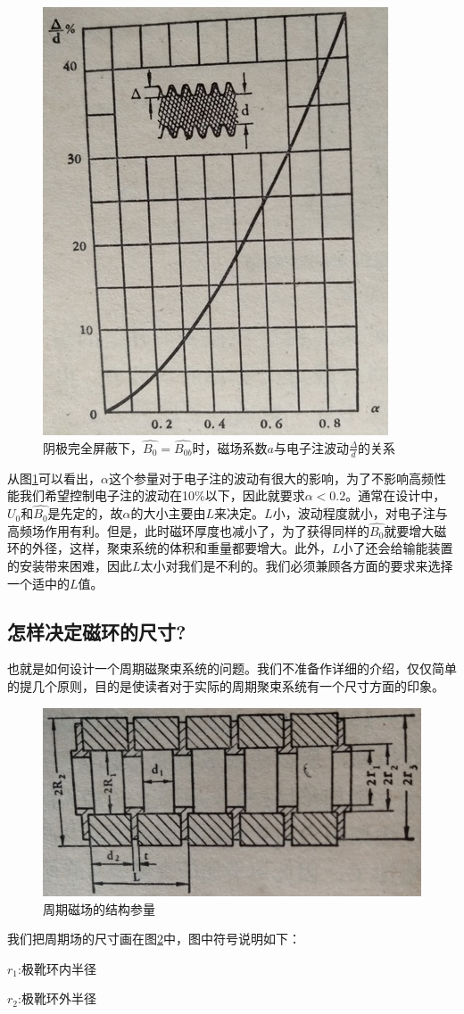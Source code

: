 \begin{figure}[phtb]
	\centering
	\includegraphics[width=0.37\linewidth]{figure/ch7-22}
	\caption{阴极完全屏蔽下，$ \hat{B_0} = \hat{B_{0b}} $时，磁场系数$ a $与电子注波动$ \frac{\Delta}{d} $的关系}
	\label{ch7-22}
\end{figure}
从图\ref{ch7-22}可以看出，$ \alpha $这个参量对于电子注的波动有很大的影响，为了不影响高频性能我们希望控制电子注的波动在10\%以下，因此就要求$ \alpha < 0.2 $。通常在设计中，$ U_0 $和$ \hat{B_{0}} $是先定的，故$ \alpha $的大小主要由$ L $来决定。$ L $小，波动程度就小，对电子注与高频场作用有利。但是，此时磁环厚度也减小了，为了获得同样的$ \hat{B_0} $就要增大磁环的外径，这样，聚束系统的体积和重量都要增大。此外，$ L $小了还会给输能装置的安装带来困难，因此$ L $太小对我们是不利的。我们必须兼顾各方面的要求来选择一个适中的$ L $值。
\subsection{怎样决定磁环的尺寸?}
也就是如何设计一个周期磁聚束系统的问题。我们不准备作详细的介绍，仅仅简单的提几个原则，目的是使读者对于实际的周期聚束系统有一个尺寸方面的印象。

\begin{figure}[phtb]
	\centering
	\includegraphics[width=0.5\linewidth]{figure/ch7-23}
	\caption{周期磁场的结构参量}
	\label{ch7-23}
\end{figure}
我们把周期场的尺寸画在图\ref{ch7-23}中，图中符号说明如下：


$ r_1 $:极靴环内半径

$ r_2 $:极靴环外半径

